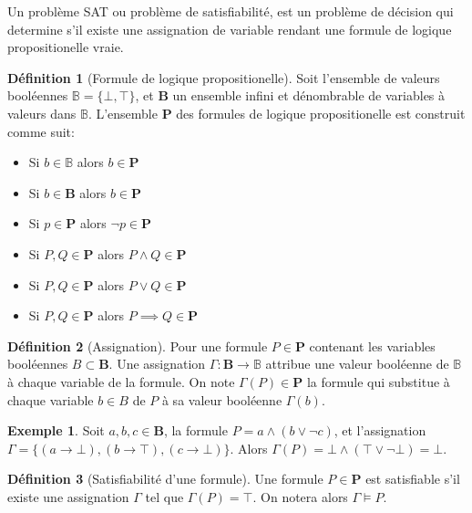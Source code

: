 \documentclass[french, 12pt, letterpaper]{article}
\theoremstyle{definition}
\newtheorem{definition}{Définition}[subsection]
\theoremstyle{proposition}
\theoremstyle{example}
\newtheorem{example}{Exemple}[definition]
\begin{document}
    Un problème SAT ou problème de satisfiabilité, est un problème de décision qui determine s'il existe une assignation de variable
    rendant une formule de logique propositionelle vraie.

    \begin{definition}[Formule de logique propositionelle]
        Soit l'ensemble de valeurs booléennes $\mathbb{B} = \{\bot, \top\}$, et $\mathbf{B}$ un ensemble infini et dénombrable de variables à valeurs dans $\mathbb{B}$.
        L'ensemble $\mathbf{P}$ des formules de logique propositionelle est construit comme suit:
        \begin{itemize}
            \item Si $b \in \mathbb{B}$ alors $b \in \mathbf{P}$
            \item Si $b \in \mathbf{B}$ alors $b \in \mathbf{P}$
            \item Si $p \in \mathbf{P}$ alors $\lnot p \in \mathbf{P}$
            \item Si $P, Q \in \mathbf{P}$ alors $P \land Q \in \mathbf{P}$
            \item Si $P, Q \in \mathbf{P}$ alors $P \lor Q \in \mathbf{P}$
            \item Si $P, Q \in \mathbf{P}$ alors $P \implies Q \in \mathbf{P}$
        \end{itemize}
    \end{definition}

    \begin{definition}[Assignation]
        Pour une formule $P \in \mathbf{P}$ contenant les variables booléennes $B \subset \mathbf{B}$.
        Une assignation $\Gamma : \mathbf{B} \rightarrow \mathbb{B}$ attribue une valeur booléenne de $\mathbb{B}$ à chaque variable de la formule.
        On note $\Gamma(P) \in \mathbf{P}$ la formule qui substitue à chaque variable $b \in B$ de $P$ à sa valeur booléenne $\Gamma(b)$.
    \end{definition}
    \begin{example}
        Soit $a, b, c \in \mathbf{B}$, la formule $P = a \land (b \lor \lnot c)$, et l'assignation $\Gamma = \{(a \rightarrow \bot), (b \rightarrow \top), (c \rightarrow \bot)\}$.
        Alors $\Gamma(P) = \bot \land (\top \lor \lnot \bot) = \bot$.
    \end{example}

    \begin{definition}[Satisfiabilité d'une formule]
        Une formule $P \in \mathbf{P}$ est satisfiable s'il existe une assignation $\Gamma$ tel que $\Gamma(P) = \top$.
        On notera alors $\Gamma \vDash P$.
    \end{definition}
\end{document}
